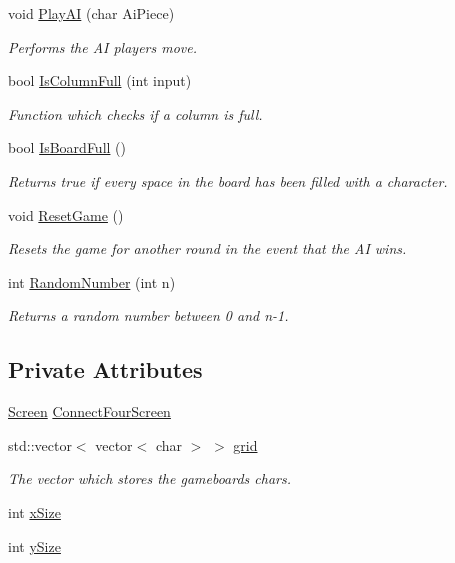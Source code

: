 \begin{DoxyCompactItemize}
\item 
void \hyperlink{classConnectFour_a618f3caa7db76bc8b4832a2338967a5b}{Play\-A\-I} (char Ai\-Piece)
\begin{DoxyCompactList}\small\item\em Performs the A\-I players move. \end{DoxyCompactList}\item 
bool \hyperlink{classConnectFour_a26d75c9c50d6424df11de765086edc8a}{Is\-Column\-Full} (int input)
\begin{DoxyCompactList}\small\item\em Function which checks if a column is full. \end{DoxyCompactList}\item 
bool \hyperlink{classConnectFour_a408b2a0222e08488c258e4225ba5b8f6}{Is\-Board\-Full} ()
\begin{DoxyCompactList}\small\item\em Returns true if every space in the board has been filled with a character. \end{DoxyCompactList}\item 
void \hyperlink{classConnectFour_aa563db9c04480dc44a37df28d07c776c}{Reset\-Game} ()
\begin{DoxyCompactList}\small\item\em Resets the game for another round in the event that the A\-I wins. \end{DoxyCompactList}\item 
int \hyperlink{classConnectFour_a51e2239fa0b4e8c16fb43fe2efb543aa}{Random\-Number} (int n)
\begin{DoxyCompactList}\small\item\em Returns a random number between 0 and n-\/1. \end{DoxyCompactList}\end{DoxyCompactItemize}
\subsection*{Private Attributes}
\begin{DoxyCompactItemize}
\item 
\hyperlink{classScreen}{Screen} \hyperlink{classConnectFour_a7548207e4c83260233e8d3668ae3e7e2}{Connect\-Four\-Screen}
\item 
std\-::vector$<$ vector$<$ char $>$ $>$ \hyperlink{classConnectFour_add9742cf2d2ffd9524d454762dbd3154}{grid}
\begin{DoxyCompactList}\small\item\em The vector which stores the gameboards chars. \end{DoxyCompactList}\item 
int \hyperlink{classConnectFour_a9ebcc46eaaac1805eab8b90925f83a63}{x\-Size}
\item 
int \hyperlink{classConnectFour_acd39fbfa19a81ab05e7aae3ac51e9ed8}{y\-Size}
\end{DoxyCompactItemize}


